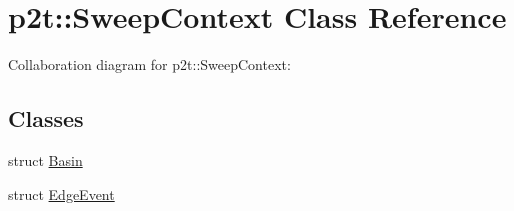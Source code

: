 \hypertarget{classp2t_1_1_sweep_context}{\section{p2t\+:\+:Sweep\+Context Class Reference}
\label{classp2t_1_1_sweep_context}
}


Collaboration diagram for p2t\+:\+:Sweep\+Context\+:
\subsection*{Classes}
\begin{DoxyCompactItemize}
\item 
struct \hyperlink{structp2t_1_1_sweep_context_1_1_basin}{Basin}
\item 
struct \hyperlink{structp2t_1_1_sweep_context_1_1_edge_event}{Edge\+Event}
\end{DoxyCompactItemize}
